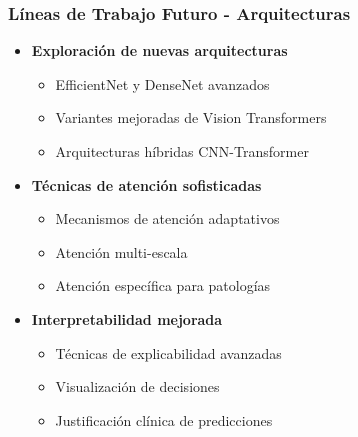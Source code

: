 \begin{frame}
\frametitle{Líneas de Trabajo Futuro - Arquitecturas}
\begin{itemize}
    \item \textbf{Exploración de nuevas arquitecturas}
    \begin{itemize}
        \item EfficientNet y DenseNet avanzados
        \item Variantes mejoradas de Vision Transformers
        \item Arquitecturas híbridas CNN-Transformer
    \end{itemize}
    \item \textbf{Técnicas de atención sofisticadas}
    \begin{itemize}
        \item Mecanismos de atención adaptativos
        \item Atención multi-escala
        \item Atención específica para patologías
    \end{itemize}
    \item \textbf{Interpretabilidad mejorada}
    \begin{itemize}
        \item Técnicas de explicabilidad avanzadas
        \item Visualización de decisiones
        \item Justificación clínica de predicciones
    \end{itemize}
\end{itemize}
\end{frame}

